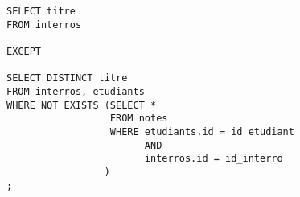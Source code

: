 \medskip{}

\question{}
\begin{verbatim}
SELECT titre
FROM interros

EXCEPT 

SELECT DISTINCT titre 
FROM interros, etudiants
WHERE NOT EXISTS (SELECT *
                  FROM notes
                  WHERE etudiants.id = id_etudiant
                        AND
                        interros.id = id_interro
                 )
;
\end{verbatim}


